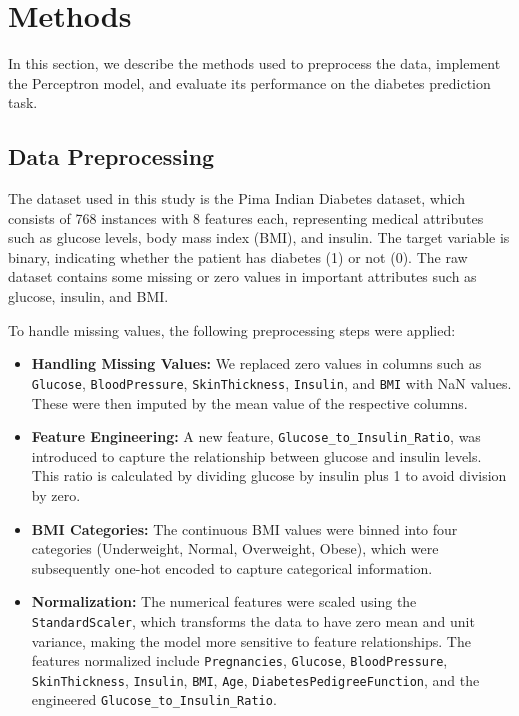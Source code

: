 \documentclass[10pt,twocolumn,letterpaper]{article}
\begin{document}
\section{Methods}
In this section, we describe the methods used to preprocess the data, implement the Perceptron model, and evaluate its performance on the diabetes prediction task.

\subsection{Data Preprocessing}
The dataset used in this study is the Pima Indian Diabetes dataset, which consists of 768 instances with 8 features each, representing medical attributes such as glucose levels, body mass index (BMI), and insulin. The target variable is binary, indicating whether the patient has diabetes (1) or not (0). The raw dataset contains some missing or zero values in important attributes such as glucose, insulin, and BMI. 

To handle missing values, the following preprocessing steps were applied:
\begin{itemize}
    \item \textbf{Handling Missing Values:} We replaced zero values in columns such as \texttt{Glucose}, \texttt{BloodPressure}, \texttt{SkinThickness}, \texttt{Insulin}, and \texttt{BMI} with NaN values. These were then imputed by the mean value of the respective columns.
    \item \textbf{Feature Engineering:} A new feature, \texttt{Glucose\_to\_Insulin\_Ratio}, was introduced to capture the relationship between glucose and insulin levels. This ratio is calculated by dividing glucose by insulin plus 1 to avoid division by zero.
    \item \textbf{BMI Categories:} The continuous BMI values were binned into four categories (Underweight, Normal, Overweight, Obese), which were subsequently one-hot encoded to capture categorical information.
    \item \textbf{Normalization:} The numerical features were scaled using the \texttt{StandardScaler}, which transforms the data to have zero mean and unit variance, making the model more sensitive to feature relationships. The features normalized include \texttt{Pregnancies}, \texttt{Glucose}, \texttt{BloodPressure}, \texttt{SkinThickness}, \texttt{Insulin}, \texttt{BMI}, \texttt{Age}, \texttt{DiabetesPedigreeFunction}, and the engineered \texttt{Glucose\_to\_Insulin\_Ratio}.
\end{itemize}
\end{document}
